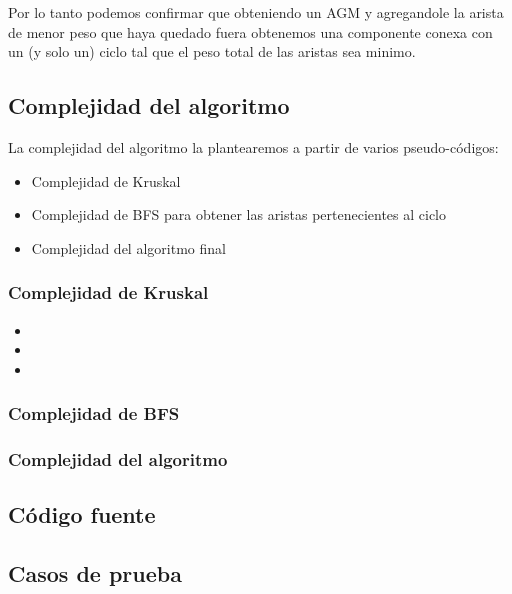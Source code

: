 Por lo tanto podemos confirmar que obteniendo un AGM y agregandole la arista de menor peso que haya quedado fuera obtenemos una componente conexa con un (y solo un) ciclo tal que el peso total de las aristas sea minimo.


\newpage

\subsection{Complejidad del algoritmo}

La complejidad del algoritmo la plantearemos a partir de varios pseudo-códigos:

\begin{itemize}
\item Complejidad de Kruskal
\item Complejidad de BFS para obtener las aristas pertenecientes al ciclo
\item Complejidad del algoritmo final
\end{itemize}

\subsubsection{Complejidad de Kruskal}

\begin{itemize}
\item
\item 
\item 
\end{itemize}


\subsubsection{Complejidad de BFS}
\subsubsection{Complejidad del algoritmo}



\newpage

\subsection{C\'odigo fuente}


\newpage

\subsection{Casos de prueba}

